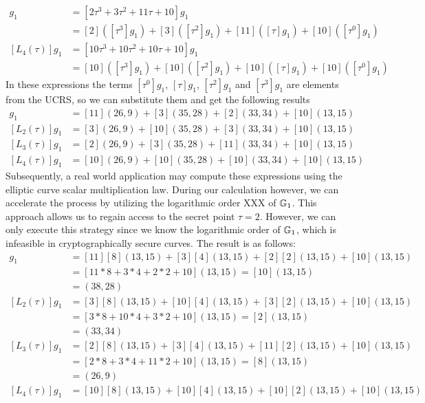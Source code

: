 \begin{example}
\begin{align*}
[L_3(\tau)]g_1 & = [2\tau^3 + 3\tau^2 +11\tau +10 ] g_1 \\
               & = [2]([\tau^3]g_1) + [3]([\tau^2]g_1) +[11]([\tau]g_1) +[10]([\tau^0]g_1)\\
[L_4(\tau)]g_1 & = [10\tau^3 + 10 \tau^2 +10\tau + 10] g_1 \\
               & = [10]([\tau^3]g_1) + [10]([\tau^2]g_1) + [10]([\tau]g_1) + [10]([\tau^0] g_1)
\end{align*}
In these expressions the terms $[\tau^0]g_1$, $[\tau]g_1$, $[\tau^2]g_1$ and $[\tau^3]g_1$ are elements from the UCRS, so we can substitute them and get the following results
\begin{align*}
[L_1(\tau)]g_1 & = [11](26,9) +[3](35,28) +[2](33,34) + [10](13,15)\\
[L_2(\tau)]g_1 & = [3](26,9) + [10](35,28) + [3](33,34) + [10](13,15)\\
[L_3(\tau)]g_1 & = [2](26,9) + [3](35,28) +[11](33,34) +[10](13,15)\\
[L_4(\tau)]g_1 & = [10](26,9)+[10](35,28)+[10](33,34) + [10](13,15)
\end{align*}
Subsequently, a real world application may compute these expressions using the elliptic curve scalar multiplication law. During our calculation however, we can accelerate the process by utilizing the logarithmic order XXX of $\mathbb{G}_1$. This approach allows us to regain access to the secret point $\tau=2$. However, we can only execute this strategy since we know the logarithmic order of $\mathbb{G}_1$, which is infeasible in cryptographically secure curves. The result is as follows:
\begin{align*}
[L_1(\tau)]g_1 & = [11][8](13,15) +[3][4](13,15) +[2][2](13,15) + [10](13,15) \\
               & = [11*8+3*4+2*2+10](13,15) = [10](13,15) \\
               & = (38,28)\\
[L_2(\tau)]g_1 & = [3][8](13,15) + [10][4](13,15) + [3][2](13,15) + [10](13,15) \\
               & = [3*8+10*4+3*2+10](13,15) = [2](13,15) \\
               & = (33,34)\\
[L_3(\tau)]g_1 & = [2][8](13,15) + [3][4](13,15) +[11][2](13,15) +[10](13,15)\\
               & = [2*8+3*4+11*2+10](13,15) = [8](13,15)\\
               & = (26,9)\\
[L_4(\tau)]g_1 & = [10][8](13,15) + [10][4](13,15) + [10][2](13,15) + [10](13,15)\\

\end{align*}
\end{example}
